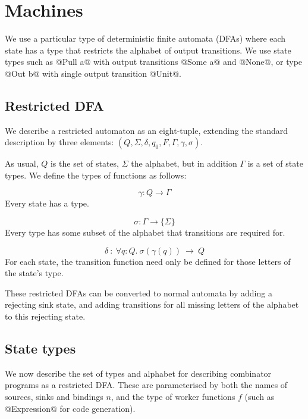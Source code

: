 \section{Machines}
\label{s:Machines}

We use a particular type of deterministic finite automata (DFAs) where each state has a type that restricts the alphabet of output transitions.
We use state types such as @Pull a@ with output transitions @Some a@ and @None@, or type @Out b@ with single output transition @Unit@.

\subsection{Restricted DFA}

We describe a restricted automaton as an eight-tuple, extending the standard description by three elements: $(Q, \Sigma, \delta, q_0, F, \Gamma, \gamma, \sigma)$.

As usual, $Q$ is the set of states, $\Sigma$ the alphabet, but in addition $\Gamma$ is a set of state types.
We define the types of functions as follows:

\[ \gamma : Q \to \Gamma \]
Every state has a type.

\[ \sigma : \Gamma \to \{ \Sigma \} \]
Every type has some subset of the alphabet that transitions are required for.

\[ \delta ~:~\forall q : Q.\ \sigma(\gamma(q))~\to~Q \]
For each state, the transition function need only be defined for those letters of the state's type.

These restricted DFAs can be converted to normal automata by adding a rejecting sink state, and adding transitions for all missing letters of the alphabet to this rejecting state.

\subsection{State types}
We now describe the set of types and alphabet for describing combinator programs as a restricted DFA.
These are parameterised by both the names of sources, sinks and bindings $n$, and the type of worker functions $f$ (such as @Expression@ for code generation).

